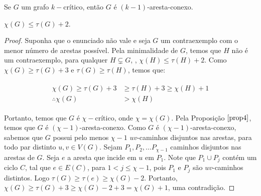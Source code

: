 \documentclass[12pt]{article}
\begin{document}
 \begin{prop}
 	\label{prop4}
 	Se $G$ um grafo $k-$crítico, então $G$ é $(k-1)$-aresta-conexo.
 \end{prop}\newbegin
 
 \begin{teo}
 	$\chi(G) \leq \tau(G) + 2$.
 \end{teo}
 
 \begin{proof}
 	Suponha que o enunciado não vale e seja $G$ um contraexemplo com o menor número de arestas possível. Pela minimalidade de $G$, temos que $H$ não é um contraexemplo, para qualquer $H \subsetneq G$, \ie, $\chi(H) \leq \tau(H) + 2$. Como $\chi(G) \geq \tau(G) + 3$ e $\tau(G) \geq \tau(H)$, temos que:
 	
 	\begin{align}
 		\begin{split}
 			 \chi(G) \geq \tau(G) + 3 &\geq \tau(H) + 3 \geq \chi(H) + 1 \\
 			 \therefore \chi(G) &> \chi(H)
 		\end{split} 
 	\end{align}
 	
 	Portanto, temos que $G$ é $\chi-$crítico, onde $\chi = \chi(G)$. Pela Proposição $\ref{prop4}$, temos que $G$ é $(\chi - 1)$-aresta-conexo. Como $G$ é $(\chi - 1)$-aresta-conexo, sabemos que $G$ possui pelo menos $\chi - 1$ $uv$-caminhos disjuntos nas arestas, para todo par distinto $u, v \in V(G)$. Sejam $P_1, P_2, \ldots P_{\chi - 1}$ caminhos disjuntos nas arestas de $G$. Seja $e$ a aresta que incide em $u$ em $P_1$. Note que $P_1 \cup P_j$ contém um ciclo $C$, tal que $e \in E(C)$, para $1 < j \leq \chi - 1$, pois $P_1$ e $P_j$ são $uv$-caminhos distintos. Logo $\tau(G) \geq \tau(e) \geq \chi(G) - 2$. Portanto, $\chi(G) \geq \tau(G) + 3 \geq \chi(G) - 2 + 3 = \chi(G) + 1$, uma contradição.
 	
  \end{proof}
\end{document}
